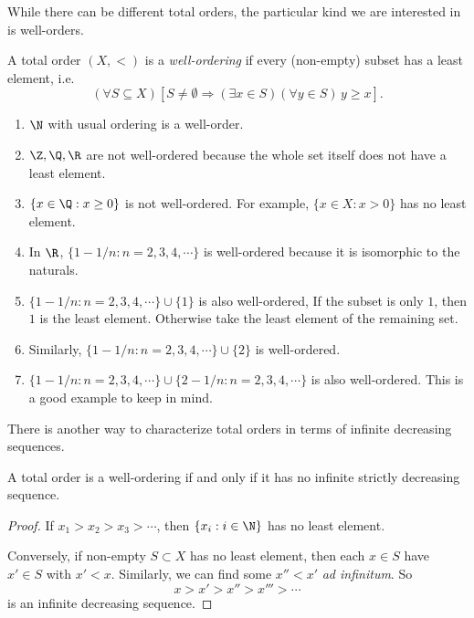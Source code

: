 \documentclass[a4paper]{article}
\begin{document}
While there can be different total orders, the particular kind we are interested in is well-orders.
\begin{defi}
  A total order $(X, <)$ is a \emph{well-ordering} if every (non-empty) subset has a least element, i.e.
  \[
    (\forall S\subseteq X)[S\not= \emptyset \Rightarrow (\exists x\in S)(\forall y\in S)\, y \geq x].
  \]
\end{defi}

\begin{eg}\leavevmode
  \begin{enumerate}
    \item $\N$ with usual ordering is a well-order.
    \item $\Z, \Q, \R$ are not well-ordered because the whole set itself does not have a least element.
    \item $\{x\in \Q: x\geq 0\}$ is not well-ordered. For example, $\{x\in X: x> 0\}$ has no least element.
    \item In $\R$, $\{1 - 1/n: n = 2, 3, 4, \cdots\}$ is well-ordered because it is isomorphic to the naturals.
    \item $\{1 - 1/n: n = 2, 3, 4, \cdots\} \cup \{1\}$ is also well-ordered, If the subset is only $1$, then $1$ is the least element. Otherwise take the least element of the remaining set.
    \item Similarly, $\{1 - 1/n: n = 2, 3, 4, \cdots\}\cup \{2\}$ is well-ordered.
    \item $\{1 - 1/n: n = 2, 3, 4, \cdots\} \cup \{2 - 1/n: n = 2, 3, 4, \cdots\}$ is also well-ordered. This is a good example to keep in mind.
  \end{enumerate}
\end{eg}

There is another way to characterize total orders in terms of infinite decreasing sequences.
\begin{prop}
  A total order is a well-ordering if and only if it has no infinite strictly decreasing sequence.
\end{prop}

\begin{proof}
  If $x_1 > x_2 > x_3 > \cdots$, then $\{x_i: i\in \N\}$ has no least element.

  Conversely, if non-empty $S\subset X$ has no least element, then each $x\in S$ have $x'\in S$ with $x' < x$. Similarly, we can find some $x'' < x'$ \emph{ad infinitum}. So
  \[
    x > x' > x'' > x''' > \cdots
  \]
  is an infinite decreasing sequence.
\end{proof}
\end{document}
